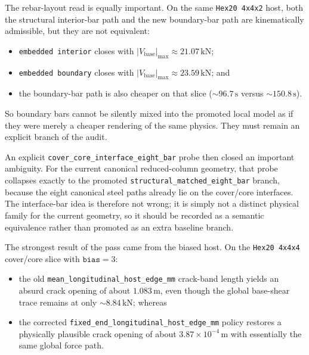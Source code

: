 The rebar-layout read is equally important. On the same \texttt{Hex20 4x4x2}
host, both the structural interior-bar path and the new boundary-bar path are
kinematically admissible, but they are not equivalent:
\begin{itemize}
  \item \texttt{embedded interior} closes with
    \(|V_{\mathrm{base}}|_{\max} \approx 21.07\,\mathrm{kN}\);
  \item \texttt{embedded boundary} closes with
    \(|V_{\mathrm{base}}|_{\max} \approx 23.59\,\mathrm{kN}\); and
  \item the boundary-bar path is also cheaper on that slice
    (\(\sim 96.7\,\mathrm{s}\) versus \(\sim 150.8\,\mathrm{s}\)).
\end{itemize}
So boundary bars cannot be silently mixed into the promoted local model as if
they were merely a cheaper rendering of the same physics. They must remain an
explicit branch of the audit.

An explicit \texttt{cover\_core\_interface\_eight\_bar} probe then closed an
important ambiguity. For the current canonical reduced-column geometry, that
probe collapses exactly to the promoted
\texttt{structural\_matched\_eight\_bar} branch, because the eight canonical
steel paths already lie on the cover/core interfaces. The interface-bar idea
is therefore not wrong; it is simply not a distinct physical family for the
current geometry, so it should be recorded as a semantic equivalence rather
than promoted as an extra baseline branch.

The strongest result of the pass came from the biased host. On the
\texttt{Hex20 4x4x4} cover/core slice with \(\texttt{bias}=3\):
\begin{itemize}
  \item the old
    \texttt{mean\_longitudinal\_host\_edge\_mm} crack-band length yields an
    absurd crack opening of about \(1.083\,\mathrm{m}\), even though the global
    base-shear trace remains at only \(\sim 8.84\,\mathrm{kN}\); whereas
  \item the corrected
    \texttt{fixed\_end\_longitudinal\_host\_edge\_mm} policy restores a
    physically plausible crack opening of about \(3.87\times10^{-4}\,\mathrm{m}\)
    with essentially the same global force path.
\end{itemize}

